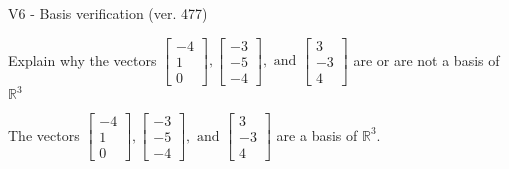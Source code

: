 \begin{exercise}
  \begin{exerciseTitle}V6 - Basis verification (ver. 477)\end{exerciseTitle}
  \begin{exerciseStatement}
    Explain why the vectors \(\left[\begin{array}{r}
-4 \\
1 \\
0
\end{array}\right] , \left[\begin{array}{r}
-3 \\
-5 \\
-4
\end{array}\right] , \text{ and } \left[\begin{array}{r}
3 \\
-3 \\
4
\end{array}\right]\) are or are not a basis of \(\mathbb{R}^3\)	


  \end{exerciseStatement}
  \begin{exerciseAnswer}
   The vectors \(\left[\begin{array}{r}
-4 \\
1 \\
0
\end{array}\right] , \left[\begin{array}{r}
-3 \\
-5 \\
-4
\end{array}\right] , \text{ and } \left[\begin{array}{r}
3 \\
-3 \\
4
\end{array}\right]\) 
  	 are  a basis of \(\mathbb{R}^3\).
  


  \end{exerciseAnswer}
\end{exercise}